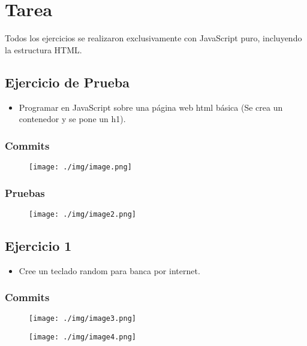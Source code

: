 \documentclass{article}
\begin{document}
\section{Tarea}
\begin{flushleft}
Todos los ejercicios se realizaron exclusivamente con JavaScript puro, incluyendo la estructura HTML.
\end{flushleft}
\subsection{Ejercicio de Prueba}
\begin{itemize}
\item{Programar en JavaScript sobre una página web html básica (Se crea un contenedor y se pone un h1).}
\end{itemize}
\subsubsection{Commits}
\begin{figure}[H]
    \centering
    \texttt{[image: ./img/image.png]}
\end{figure}
\subsubsection{Pruebas}
\begin{figure}[H]
    \centering
    \texttt{[image: ./img/image2.png]}
\end{figure}

\subsection{Ejercicio 1}
\begin{itemize}
\item{Cree un teclado random para banca por internet.}
\end{itemize}
\subsubsection{Commits}
\begin{figure}[H]
    \centering
    \texttt{[image: ./img/image3.png]}
\end{figure}
\begin{figure}[H]
    \centering
    \texttt{[image: ./img/image4.png]}
\end{figure}
\end{document}
